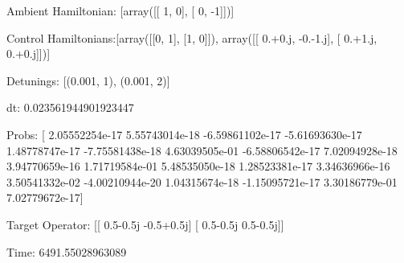 \documentclass{article}
\begin{document}
    

\newpage

Ambient Hamiltonian: [array([[ 1,  0],
       [ 0, -1]])]

Control Hamiltonians:[array([[0, 1],
       [1, 0]]), array([[ 0.+0.j, -0.-1.j],
       [ 0.+1.j,  0.+0.j]])]

Detunings: [(0.001, 1), (0.001, 2)]

 dt: 0.023561944901923447

Probs: [  2.05552254e-17   5.55743014e-18  -6.59861102e-17  -5.61693630e-17
   1.48778747e-17  -7.75581438e-18   4.63039505e-01  -6.58806542e-17
   7.02094928e-18   3.94770659e-16   1.71719584e-01   5.48535050e-18
   1.28523381e-17   3.34636966e-16   3.50541332e-02  -4.00210944e-20
   1.04315674e-18  -1.15095721e-17   3.30186779e-01   7.02779672e-17]

Target Operator: [[ 0.5-0.5j -0.5+0.5j]
 [ 0.5-0.5j  0.5-0.5j]]

Time: 6491.55028963089
\end{document}
